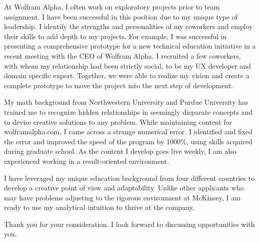 \documentclass[11pt,a4paper,unicode]{moderncv}
\begin{document}
\vspace{3mm}
At Wolfram Alpha, I often work on exploratory projects prior to team assignment. I have been successful in this position due to my unique type of leadership. I identify the strengths and personalities of my coworkers and employ their skills to add depth to my projects. For example, I was successful in presenting a comprehensive prototype for a new technical education initiative in a recent meeting with the CEO of Wolfram Alpha. I recruited a few coworkers, with whom my relationship had been strictly social, to be my UX developer and domain specific expert. Together, we were able to realize my vision and create a complete prototype to move the project into the next step of development.

\vspace{3mm}
My math background from Northwestern University and Purdue University has trained me to recognize hidden relationships in seemingly disparate concepts and to devise creative solutions to any problem. While maintaining content for wolframalpha.com, I came across a strange numerical error. I identified and fixed the error and improved the speed of the program by 1000$\%$, using skills acquired during graduate school. As the content I develop goes live weekly, I am also experienced working in a result-oriented environment.

\vspace{3mm}
I have leveraged my unique education background from four different countries to develop a creative point of view and adaptability. Unlike other applicants who may have problems adjusting to the rigorous environment at McKinsey, I am ready to use my analytical intuition to thrive at the company. 

\vspace{3mm}
Thank you for your consideration. I look forward to discussing opportunities with you.

\vspace{3mm}
\makeletterclosing %
\fi
\end{document}
